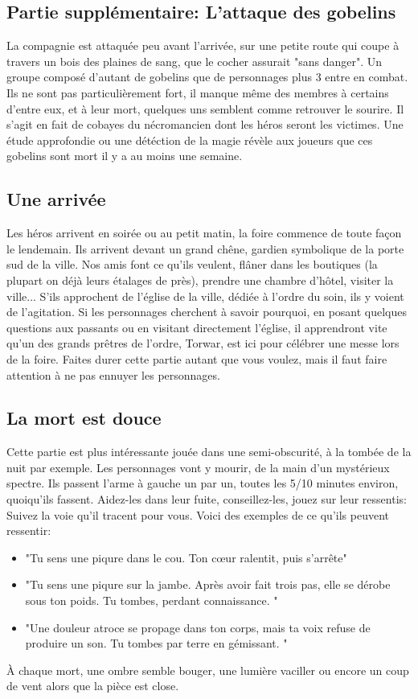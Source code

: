 \documentclass[a4paper, 11pt]{article}
\begin{document}
\subsection{Partie supplémentaire: L'attaque des gobelins} 
La compagnie est attaquée peu avant l'arrivée, sur une petite route qui coupe à travers un bois des plaines de sang, que le cocher assurait "sans danger". Un groupe composé d'autant de gobelins que de personnages plus 3 entre en combat. Ils ne sont pas particulièrement fort, il manque même des membres à certains d'entre eux, et à leur mort, quelques uns semblent comme retrouver le sourire. Il s'agit en fait de cobayes du nécromancien dont les héros seront les victimes. Une étude approfondie ou une détéction de la magie révèle aux joueurs que ces gobelins sont mort il y a au moins une semaine.

\subsection{Une arrivée}
Les héros arrivent en soirée ou au petit matin, la foire commence de toute façon le lendemain. Ils arrivent devant un grand chêne, gardien symbolique de la porte sud de la ville. Nos amis font ce qu'ils veulent, flâner dans les boutiques (la plupart on déjà leurs étalages de près), prendre une chambre d'hôtel, visiter la ville... S'ils approchent de l'église de la ville, dédiée à l'ordre du soin, ils y voient de l'agitation. Si les personnages cherchent à savoir pourquoi, en posant quelques questions aux passants ou en visitant directement l'église, il apprendront vite qu'un des grands prêtres de l'ordre, Torwar, est ici pour célébrer une messe lors de la foire. Faites durer cette partie autant que vous voulez, mais il faut faire attention à ne pas ennuyer les personnages.

\subsection{La mort est douce}
Cette partie est plus intéressante jouée dans une semi-obscurité, à la tombée de la nuit par exemple. Les personnages vont y mourir, de la main d'un mystérieux spectre. Ils passent l'arme à gauche un par un, toutes les 5/10 minutes environ, quoiqu'ils fassent. Aidez-les dans leur fuite, conseillez-les, jouez sur leur ressentis: Suivez la voie qu'il tracent pour vous. Voici des exemples de ce qu'ils peuvent ressentir:
\begin{itemize}
\item "Tu sens une piqure dans le cou. Ton cœur ralentit, puis s’arrête"
\item  "Tu sens une piqure sur la jambe. Après avoir fait trois pas, elle se dérobe sous ton poids. Tu tombes, perdant connaissance. "
\item  "Une douleur atroce se propage dans ton corps, mais ta voix refuse de produire un son. Tu tombes par terre en gémissant. "
\end{itemize}
À chaque mort, une ombre semble bouger, une lumière vaciller ou encore un coup de vent alors que la pièce est close.
\end{document}
